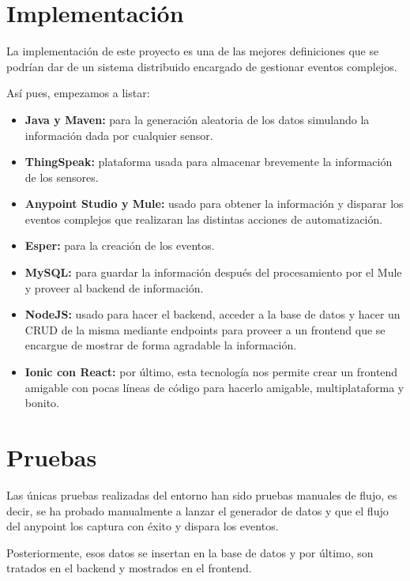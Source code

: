 \documentclass[a4paper,12pt]{article}
\begin{document}
\section{Implementación}
La implementación de este proyecto es una de las mejores definiciones que se podrían dar de un sistema distribuido
encargado de gestionar eventos complejos.

Así pues, empezamos a listar:

\begin{itemize}
  \item \textbf{Java y Maven:} para la generación aleatoria de los datos
        simulando la información dada por cualquier sensor.
  \item \textbf{ThingSpeak:} plataforma usada para almacenar brevemente
        la información de los sensores.
  \item \textbf{Anypoint Studio y Mule:} usado para obtener la información
        y disparar los eventos complejos que realizaran las
        distintas acciones de automatización.
  \item \textbf{Esper:} para la creación de los eventos.
  \item \textbf{MySQL:} para guardar la información después del procesamiento
        por el Mule y proveer al backend de información.
  \item \textbf{NodeJS:} usado para hacer el backend, acceder a la base de datos
        y hacer un CRUD de la misma mediante endpoints
        para proveer a un frontend que se encargue de mostrar de forma agradable la información.
  \item \textbf{Ionic con React:} por último, esta tecnología nos permite crear un frontend
        amigable con pocas líneas de código
        para hacerlo amigable, multiplataforma y bonito.
\end{itemize}

\section{Pruebas}
Las únicas pruebas realizadas del entorno han sido pruebas manuales de flujo, es decir, 
se ha probado manualmente a lanzar el generador de datos y que el flujo del anypoint los
captura con éxito y dispara los eventos.

Posteriormente, esos datos se insertan en la base de datos y por último, son tratados en
el backend y mostrados en el frontend.

\clearpage

\nocite{*}


\end{document}
